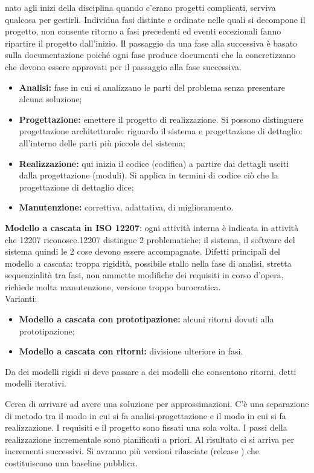 nato agli inizi della disciplina quando c'erano progetti complicati, serviva qualcosa per gestirli. Individua fasi distinte e ordinate nelle quali si decompone il progetto, non consente ritorno a fasi precedenti ed eventi eccezionali fanno ripartire il progetto dall'inizio. Il passaggio da una fase alla successiva è basato sulla documentazione poiché ogni fase produce documenti che la concretizzano che devono essere approvati per il passaggio alla fase successiva.
\begin{itemize}
\item \textbf{Analisi:} fase in cui si analizzano le parti del problema senza presentare alcuna soluzione;
\item \textbf{Progettazione:} emettere il progetto di realizzazione. Si possono distinguere progettazione architetturale: riguardo il sistema e progettazione di dettaglio: all'interno delle parti più piccole del sistema;
\item \textbf{Realizzazione:} qui inizia il codice (codifica) a partire dai dettagli usciti dalla progettazione (moduli). Si applica in termini di codice ciò che la progettazione di dettaglio dice;
\item \textbf{Manutenzione:} correttiva, adattativa, di miglioramento.
\end{itemize}
\textbf{Modello a cascata in ISO 12207}: ogni attività interna è indicata in attività che 12207 riconosce.12207 distingue 2 problematiche: il sistema, il software del sistema quindi le 2 cose devono essere accompagnate.
Difetti principali del modello a cascata: troppa rigidità, possibile stallo nella fase di analisi, stretta sequenzialità tra fasi, non ammette modifiche dei requisiti in corso d'opera, richiede molta manutenzione, versione troppo burocratica.\\
Varianti:
\begin{itemize}
\item \textbf{Modello a cascata con prototipazione:} alcuni ritorni dovuti alla prototipazione;
\item \textbf{Modello a cascata con ritorni:} divisione ulteriore in fasi.
\end{itemize}
Da dei modelli rigidi si deve passare a dei modelli che consentono ritorni, detti modelli iterativi.

Cerca di arrivare ad avere una soluzione per approssimazioni.
C'è una separazione di metodo tra il modo in cui si fa analisi-progettazione e il modo in cui si fa realizzazione. I requisiti e il progetto sono fissati una sola volta. I passi della realizzazione incrementale sono pianificati a priori. Al risultato ci si arriva per incrementi successivi. Si avranno più versioni rilasciate (release ) che costituiscono una baseline pubblica.


